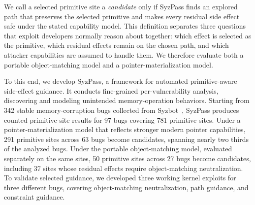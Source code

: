 We call a selected primitive site a \emph{candidate} only if SyzPass finds an explored path that preserves the selected primitive and makes every residual side effect safe under the stated capability model. This definition separates three questions that exploit developers normally reason about together: which effect is selected as the primitive, which residual effects remain on the chosen path, and which attacker capabilities are assumed to handle them. We therefore evaluate both a portable object-matching model and a pointer-materialization model.







To this end, we develop SyzPass, a framework for automated primitive-aware side-effect guidance. It conducts fine-grained per-vulnerability analysis, discovering and modeling unintended memory-operation behaviors. Starting from 342 stable memory-corruption bugs collected from Syzbot~\cite{syzbot}, SyzPass produces counted primitive-site results for 97 bugs covering 781 primitive sites. Under a pointer-materialization model that reflects stronger modern pointer capabilities, 291 primitive sites across 63 bugs become candidates, spanning nearly two thirds of the analyzed bugs. Under the portable object-matching model, evaluated separately on the same sites, 50 primitive sites across 27 bugs become candidates, including 37 sites whose residual effects require object-matching neutralization. To validate selected guidance, we developed three working kernel exploits for three different bugs, covering object-matching neutralization, path guidance, and constraint guidance.

